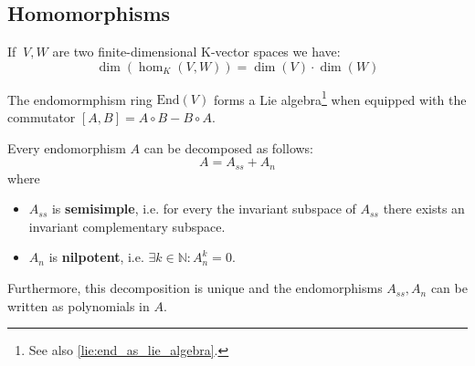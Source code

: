 \subsection{Homomorphisms}

	\begin{theorem}\label{linalgebra:hom_dimension}
	    	If $\ V,W$ are two finite-dimensional K-vector spaces we have:
        	\begin{equation}
        		\dim\left(\hom_K(V,W)\right) =\dim(V)\cdot\dim(W)
		\end{equation}
	\end{theorem}
        
	\begin{property}
		The endomormphism ring $\text{End}(V)$ forms a Lie algebra\footnote{See also \ref{lie:end_as_lie_algebra}.} when equipped with the commutator $[A, B] = A\circ B - B\circ A$.
	\end{property}
	
	\begin{property}\label{linalgebra:jordan_chevalley}
		Every endomorphism $A$ can be decomposed as follows:
		\begin{equation}
			A = A_{ss} + A_n
		\end{equation}
		where
		\begin{itemize}
			\item $A_{ss}$ is \textbf{semisimple}, i.e. for every the invariant subspace of $A_{ss}$ there exists an invariant complementary subspace.
			\item $A_n$ is \textbf{nilpotent}, i.e. $\exists k\in\mathbb{N}: A_n^k = 0$.
		\end{itemize}
		Furthermore, this decomposition is unique and the endomorphisms $A_{ss}, A_n$ can be written as polynomials in $A$.
	\end{property}
    
